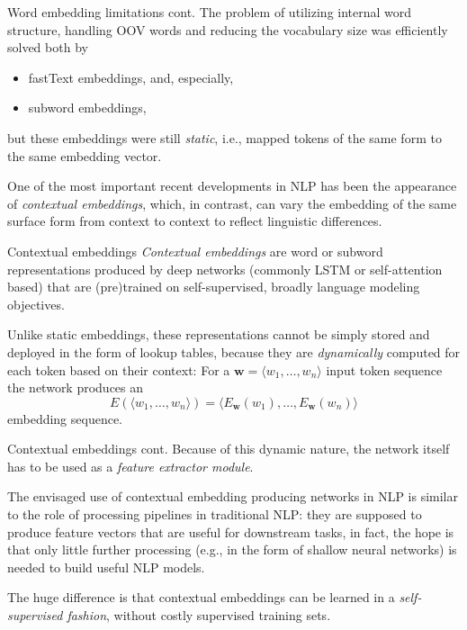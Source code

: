 \documentclass[style=upen, size=14pt]{powerdot}
\newcommand{\gold}{\color{arany}}
\theoremstyle{definition}
\begin{document}
\begin{slide}[toc=]{Word embedding limitations cont.}
  The problem of utilizing internal word structure, handling OOV words and
  reducing the vocabulary size was efficiently solved both by
  \begin{itemize}
  \item fastText embeddings, and, especially,
  \item subword embeddings,
  \end{itemize}
  but these embeddings were still \emph{\gold static}, i.e., mapped tokens
  of the same form to the same embedding vector.

  One of the most important recent developments in NLP has been the appearance
  of \emph{\gold contextual embeddings}, which, in contrast, can vary the
  embedding of the same surface form from context to context to reflect
  linguistic differences.
\end{slide}

\begin{slide}[toc=Contextual embeddings]{Contextual embeddings}
  \emph{\gold Contextual embeddings} are word or subword representations
  produced by deep networks (commonly LSTM or self-attention based) that are
  (pre)trained on self-supervised, broadly language modeling objectives.
  \bigskip

  Unlike static embeddings, these representations cannot be simply stored and
  deployed in the form of lookup tables, because they are \emph{dynamically}
  computed for each token based on their context: For a
  $\mathbf{w} = \langle w_1,\dots ,w_n \rangle$ input token sequence the network
  produces an
  $$
  E(\langle w_1,\dots ,w_n \rangle) = \langle
  E_\mathbf{w}(w_1),\dots,E_\mathbf{w}(w_n)\rangle
  $$
  embedding sequence.
\end{slide}

\begin{slide}[toc=]{Contextual embeddings cont.}
  Because of this dynamic nature, the network itself has to be used as a
  \emph{\gold feature extractor module}.\bigskip

  The envisaged use of contextual embedding producing networks in NLP is similar
  to the role of processing pipelines in traditional NLP: they are supposed to
  produce feature vectors that are useful for downstream tasks, in fact, the
  hope is that only little further processing (e.g., in the form of shallow
  neural networks) is needed to build useful NLP models.\bigskip

  The huge difference is that contextual embeddings can be learned in a
  \emph{\gold self-supervised fashion}, without costly supervised training sets.
\end{slide}
\end{document}
